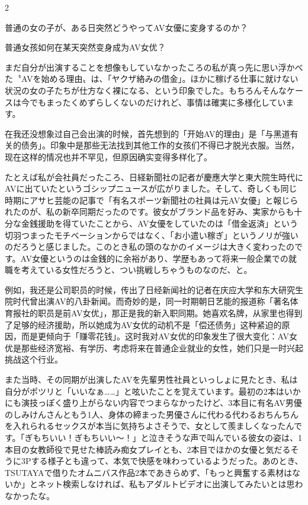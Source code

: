 \documentclass[12pt,UTF8]{ctexbook}
\begin{document}
\begin{paracol}{2}

普通の女の子が、ある日突然どうやってAV女優に変身するのか？

\switchcolumn

普通女孩如何在某天突然变身成为AV女优？

\switchcolumn*

まだ自分が出演することを想像もしていなかったころの私が真っ先に思い浮かべた〝AVを始める理由〟は、「ヤクザ絡みの借金」。ほかに稼げる仕事に就けない状況の女の子たちが仕方なく裸になる、という印象でした。もちろんそんなケースは今でもまったくめずらしくないのだけれど、事情は確実に多様化しています。

\switchcolumn

在我还没想象过自己会出演的时候，首先想到的「开始AV的理由」是「与黑道有关的债务」。印象中是那些无法找到其他工作的女孩们不得已才脱光衣服。当然，现在这样的情况也并不罕见，但原因确实变得多样化了。

\switchcolumn*

たとえば私が会社員だったころ、日経新聞社の記者が慶應大学と東大院生時代にAVに出ていたというゴシップニュースが広がりました。そして、奇しくも同じ時期にアサヒ芸能の記事で「有名スポーツ新聞社の社員は元AV女優」と報じられたのが、私の新卒同期だったのです。彼女がブランド品を好み、実家からも十分な金銭援助を得ていたことから、AV女優をしていたのは「借金返済」という切羽つまったモチベーションからではなく、「お小遣い稼ぎ」というノリが強いのだろうと感じました。このとき私の頭のなかのイメージは大きく変わったのです。AV女優というのは金銭的に余裕があり、学歴もあって将来一般企業での就職を考えている女性だろうと、つい挑戦しちゃうものなのだ、と。

\switchcolumn

例如，我还是公司职员的时候，传出了日经新闻社的记者在庆应大学和东大研究生院时代曾出演AV的八卦新闻。而奇妙的是，同一时期朝日艺能的报道称「著名体育报社的职员是前AV女优」，那正是我的新入职同期。她喜欢名牌，从家里也得到了足够的经济援助，所以她成为AV女优的动机不是「偿还债务」这种紧迫的原因，而是更倾向于「赚零花钱」。这时我对AV女优的印象发生了很大变化：AV女优是那些经济宽裕、有学历、考虑将来在普通企业就业的女性，她们只是一时兴起挑战这个行业。

\switchcolumn*

また当時、その同期が出演したAVを先輩男性社員といっしょに見たとき、私は自分がポツリと「いいなぁ……」と呟いたことを覚えています。最初の2本はいかにも演技っぽく盛り上がらない内容でつまらなかったけど、3本目に有名AV男優のしみけんさんともう1人、身体の締まった男優さんに代わる代わるおちんちんを入れられるセックスが本当に気持ちよさそうで、女として羨ましくなったんです。「ぎもちいい！ぎもちいい〜！」と泣きそうな声で叫んでいる彼女の姿は、1本目の女教師役で見せた棒読み痴女プレイとも、2本目でほかの女優と気だるそうに3Pする様子とも違って、本気で快感を味わっているようだった。あのとき、TSUTAYAで借りたオムニバス作品2本であきらめず、「もっと興奮する素材はないか」とネット検索しなければ、私もアダルトビデオに出演してみたいとは思わなかったな。


\end{paracol}
\end{document}
